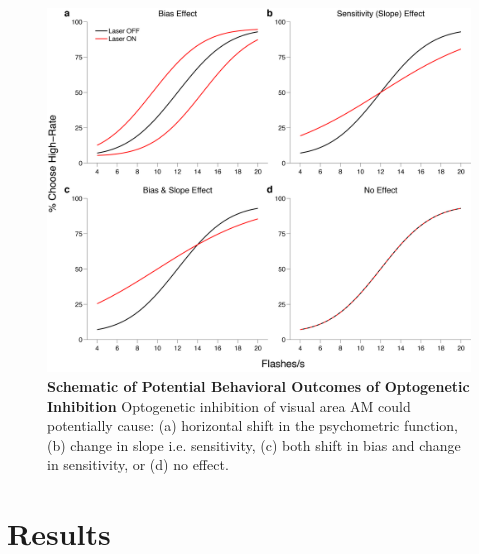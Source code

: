 \begin{figure}
  \centering
   \includegraphics[width=\textwidth]{Figures/chapter4/pmfPredictions.png}
  \caption[Schematic of Potential Behavioral Outcomes of Optogenetic Inhibition]{\textbf{Schematic of Potential Behavioral Outcomes of Optogenetic Inhibition} Optogenetic inhibition of visual area AM could potentially cause: (a) horizontal shift in the psychometric function, (b) change in slope i.e. sensitivity, (c) both shift in bias and change in sensitivity, or (d) no effect.}
   \label{fig:predictions}
\end{figure}
\section{Results}
